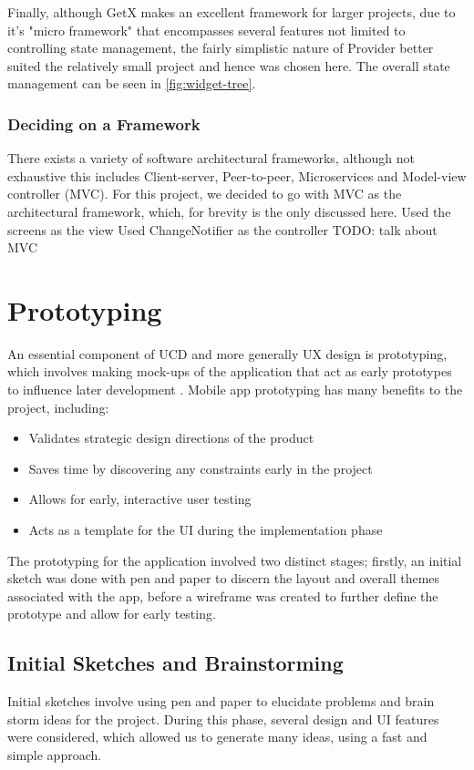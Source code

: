 \documentclass[12pt]{article}
\begin{document}
	 Finally, although GetX makes an excellent framework for larger projects, due to it's "micro framework" that encompasses several features not limited to controlling state management, the fairly simplistic nature of Provider better suited the relatively small project and hence was chosen here. The overall state management can be seen in \autoref{fig:widget-tree}.
	 	
	 	
	


	\subsubsection{Deciding on a Framework}
	There exists a variety of software architectural frameworks, although not exhaustive this includes Client-server, Peer-to-peer, Microservices and Model-view controller (MVC). For this project, we decided to go with MVC as the architectural framework, which, for brevity is the only discussed here.
	Used the screens as the view
	Used ChangeNotifier as the controller
	TODO: talk about MVC
	
	\section{Prototyping}
	An essential component of UCD and more generally UX design is prototyping, which involves making mock-ups of the application that act as early prototypes to influence later development \cite{arnowitzChapter15Wireframe2007}. Mobile app prototyping has many benefits to the project, including:
	\begin{itemize}
		\item Validates strategic design directions of the product
		\item Saves time by discovering any constraints early in the project
		\item Allows for early, interactive user testing
		\item Acts as a template for the UI during the implementation phase
	\end{itemize}
	 
	
	The prototyping for the application involved two distinct stages; firstly, an initial sketch was done with pen and paper to discern the layout and overall themes associated with the app, before a wireframe was created to further define the prototype and allow for early testing.
	
	\subsection{Initial Sketches and Brainstorming}
	Initial sketches involve using pen and paper to elucidate problems and brain storm ideas for the project. During this phase, several design and UI features were considered, which allowed us to generate many ideas, using a fast and simple approach.
	
\end{document}
